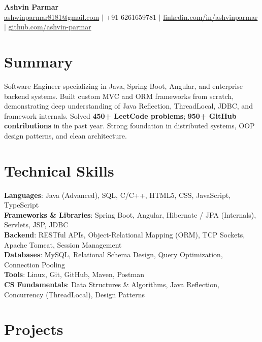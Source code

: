 \documentclass[a4paper,10pt]{article}
\begin{document}
\begin{center}
    {\LARGE \textbf{Ashvin Parmar}}\\
    \vspace{1mm}
    \href{mailto:ashwinparmar8181@gmail.com}{ashwinparmar8181@gmail.com} $|$
    +91 6261659781 $|$
    \href{https://www.linkedin.com/in/ashvinparmar/}{linkedin.com/in/ashvinparmar} $|$
    \href{https://github.com/ashvin-parmar}{github.com/ashvin-parmar}
\end{center}

\section*{Summary}
Software Engineer specializing in Java, Spring Boot, Angular, and enterprise backend systems. Built custom MVC and ORM frameworks from scratch, demonstrating deep understanding of Java Reflection, ThreadLocal, JDBC, and framework internals. Solved \textbf{450+ LeetCode problems}; \textbf{950+ GitHub contributions} in the past year. Strong foundation in distributed systems, OOP design patterns, and clean architecture.

\section*{Technical Skills}
\textbf{Languages}: Java (Advanced), SQL, C/C++, HTML5, CSS, JavaScript, TypeScript \\
\textbf{Frameworks \& Libraries}: Spring Boot, Angular, Hibernate / JPA (Internals), Servlets, JSP, JDBC \\
\textbf{Backend}: RESTful APIs, Object-Relational Mapping (ORM), TCP Sockets, Apache Tomcat, Session Management \\
\textbf{Databases}: MySQL, Relational Schema Design, Query Optimization, Connection Pooling \\
\textbf{Tools}: Linux, Git, GitHub, Maven, Postman \\
\textbf{CS Fundamentals}: Data Structures \& Algorithms, Java Reflection, Concurrency (ThreadLocal), Design Patterns

\section*{Projects}
\end{document}
